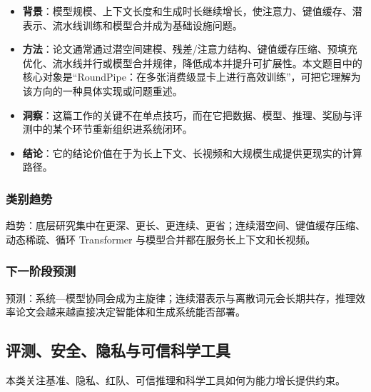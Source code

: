 \begin{enumerate}[leftmargin=1.5em]
\begin{itemize}[leftmargin=1.5em]
    \item \textbf{背景}：模型规模、上下文长度和生成时长继续增长，使注意力、键值缓存、潜表示、流水线训练和模型合并成为基础设施问题。
    \item \textbf{方法}：论文通常通过潜空间建模、残差/注意力结构、键值缓存压缩、预填充优化、流水线并行或模型合并规律，降低成本并提升可扩展性。本文题目中的核心对象是“RoundPipe：在多张消费级显卡上进行高效训练”，可把它理解为该方向的一种具体实现或问题重述。
    \item \textbf{洞察}：这篇工作的关键不在单点技巧，而在它把数据、模型、推理、奖励与评测中的某个环节重新组织进系统闭环。
    \item \textbf{结论}：它的结论价值在于为长上下文、长视频和大规模生成提供更现实的计算路径。
  \end{itemize}
\end{enumerate}

\subsubsection{类别趋势}
趋势：底层研究集中在更深、更长、更连续、更省；连续潜空间、键值缓存压缩、动态稀疏、循环 Transformer 与模型合并都在服务长上下文和长视频。

\subsubsection{下一阶段预测}
预测：系统—模型协同会成为主旋律；连续潜表示与离散词元会长期共存，推理效率论文会越来越直接决定智能体和生成系统能否部署。

\subsection{评测、安全、隐私与可信科学工具}

本类关注基准、隐私、红队、可信推理和科学工具如何为能力增长提供约束。

